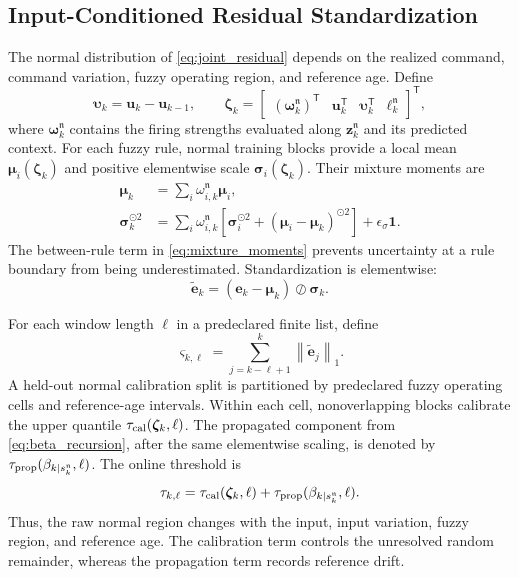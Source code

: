 \documentclass[journal]{IEEEtran}
\newcommand{\norm}[1]{\left\lVert #1\right\rVert}
\newcommand{\T}{\mathsf T}
\newcommand{\1}{\bm 1}
\begin{document}
\subsection{Input-Conditioned Residual Standardization}
The normal distribution of \eqref{eq:joint_residual} depends on the realized
command, command variation, fuzzy operating region, and reference age. Define
\begin{equation}
\bm\upsilon_k=\bm u_k-\bm u_{k-1},\qquad
\bm\zeta_k=
\begin{bmatrix}
(\bm\omega_k^{\mathfrak n})^\T&
\bm u_k^\T&
\bm\upsilon_k^\T&
\ell_k^{\mathfrak n}
\end{bmatrix}^{\T},
\label{eq:descriptor}
\end{equation}
where $\bm\omega_k^{\mathfrak n}$ contains the firing strengths evaluated
along $\bm z_k^{\mathfrak n}$ and its predicted context. For each fuzzy rule,
normal training
blocks provide a local mean $\bm\mu_i(\bm\zeta_k)$ and positive elementwise
scale $\bm\sigma_i(\bm\zeta_k)$. Their mixture moments are
\begin{equation}
\begin{aligned}
\bm\mu_k&=\sum_i\omega_{i,k}^{\mathfrak n}\bm\mu_i,\\
\bm\sigma_k^{\odot2}
&=\sum_i\omega_{i,k}^{\mathfrak n}
\left[
\bm\sigma_i^{\odot2}
+(\bm\mu_i-\bm\mu_k)^{\odot2}
\right]+\epsilon_\sigma\1 .
\end{aligned}
\label{eq:mixture_moments}
\end{equation}
The between-rule term in \eqref{eq:mixture_moments} prevents uncertainty at a
rule boundary from being underestimated. Standardization is elementwise:
\begin{equation}
\widetilde{\bm e}_k=
(\bm e_k-\bm\mu_k)\oslash\bm\sigma_k.
\label{eq:standardized_residual}
\end{equation}

For each window length $\ell$ in a predeclared finite list, define
\begin{equation}
\varsigma_{k,\ell}=
\sum_{j=k-\ell+1}^{k}\norm{\widetilde{\bm e}_j}_1.
\label{eq:window_score}
\end{equation}
A held-out normal calibration split is partitioned by predeclared fuzzy
operating cells and reference-age intervals. Within each cell, nonoverlapping
blocks calibrate the upper quantile
$\tau_{\rm cal}(\bm\zeta_k,\ell)$. The propagated component from
\eqref{eq:beta_recursion}, after the same elementwise scaling, is denoted by
$\tau_{\rm prop}(\beta_{k\mid s_k^{\mathfrak n}},\ell)$. The online threshold
is
\begin{equation}
\tau_{k,\ell}=
\tau_{\rm cal}(\bm\zeta_k,\ell)
+\tau_{\rm prop}(\beta_{k\mid s_k^{\mathfrak n}},\ell).
\label{eq:dynamic_threshold}
\end{equation}
Thus, the raw normal region changes with the input, input variation, fuzzy
region, and reference age. The calibration term controls the unresolved
random remainder, whereas the propagation term records reference drift.
\end{document}

